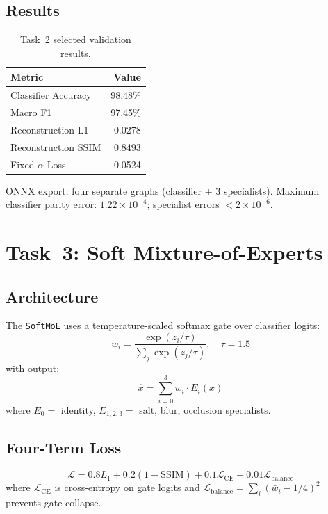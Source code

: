 \documentclass[conference]{IEEEtran}
\begin{document}
\subsection{Results}
\begin{table}[h]
\centering
\caption{Task~2 selected validation results.}
\label{tab:task2}
\begin{tabular}{@{}lr@{}}
\toprule
\textbf{Metric} & \textbf{Value} \\
\midrule
Classifier Accuracy & 98.48\% \\
Macro F1 & 97.45\% \\
Reconstruction L1 & 0.0278 \\
Reconstruction SSIM & 0.8493 \\
Fixed-$\alpha$ Loss & 0.0524 \\
\bottomrule
\end{tabular}
\end{table}

ONNX export: four separate graphs (classifier + 3 specialists). Maximum classifier parity error: $1.22 \times 10^{-4}$; specialist errors $< 2 \times 10^{-6}$.


\section{Task~3: Soft Mixture-of-Experts}

\subsection{Architecture}
The \texttt{SoftMoE} uses a temperature-scaled softmax gate over classifier logits:
\begin{equation}
w_i = \frac{\exp(z_i / \tau)}{\sum_j \exp(z_j / \tau)}, \quad \tau = 1.5
\end{equation}
with output:
\begin{equation}
\hat{x} = \sum_{i=0}^{3} w_i \cdot E_i(x)
\end{equation}
where $E_0 =$ identity, $E_{1,2,3} =$ salt, blur, occlusion specialists.

\subsection{Four-Term Loss}
\begin{equation}
\mathcal{L} = 0.8 L_1 + 0.2(1 - \text{SSIM}) + 0.1 \mathcal{L}_{\text{CE}} + 0.01 \mathcal{L}_{\text{balance}}
\end{equation}
where $\mathcal{L}_{\text{CE}}$ is cross-entropy on gate logits and $\mathcal{L}_{\text{balance}} = \sum_i (\bar{w}_i - 1/4)^2$ prevents gate collapse.
\end{document}
